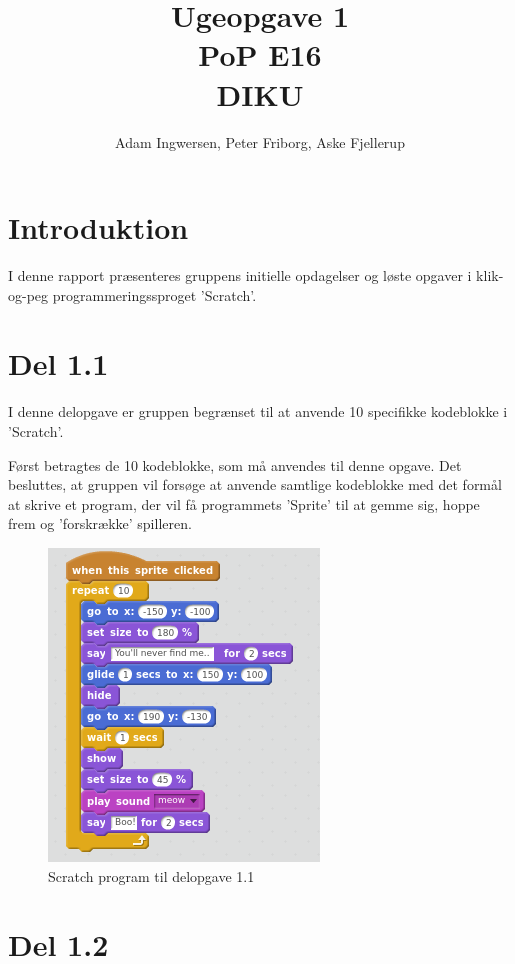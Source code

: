 \documentclass[11pt,a4paper,final]{article}
\begin{document}
\author{Adam Ingwersen, Peter Friborg, Aske Fjellerup}
\title{Ugeopgave 1 \\ PoP E16 \\ DIKU}
\maketitle

\section*{Introduktion}
I denne rapport præsenteres gruppens initielle opdagelser og løste opgaver i klik-og-peg programmeringssproget 'Scratch'. 

\section*{Del 1.1}
I denne delopgave er gruppen begrænset til at anvende 10 specifikke kodeblokke i 'Scratch'. 

Først betragtes de 10 kodeblokke, som må anvendes til denne opgave. Det besluttes, at gruppen vil forsøge at anvende samtlige kodeblokke med det formål at skrive et program, der vil få programmets 'Sprite' til at gemme sig, hoppe frem og 'forskrække' spilleren. 

\begin{figure}[H]
\centering
\includegraphics[scale = 0.5]{1_1}
\caption{Scratch program til delopgave 1.1}
\end{figure}

\section*{Del 1.2}
\end{document}
